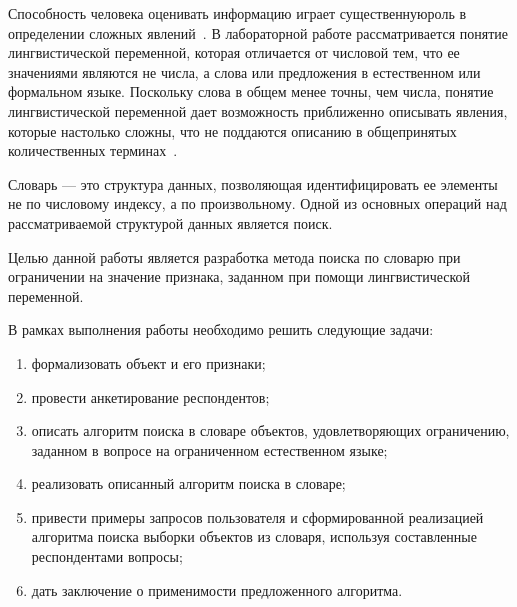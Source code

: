 \vspace{\baselineskip}

Способность человека оценивать информацию играет существенную\linebreak роль в определении сложных явлений~\cite{ling2}. 
В лабораторной работе рассматривается понятие лингвистической переменной, которая отличается от числовой тем, что ее значениями являются не числа, а слова или предложения в естественном или формальном языке. 
Поскольку слова в общем менее точны, чем числа, понятие лингвистической переменной дает возможность приближенно описывать явления, которые настолько сложны, что не поддаются описанию в общепринятых количественных терминах~\cite{ling1}.

Словарь --- это структура данных, позволяющая идентифицировать ее элементы не по числовому индексу, а по произвольному.
Одной из основных операций над рассматриваемой структурой данных является поиск.

Целью данной работы является разработка метода поиска по словарю при ограничении на значение признака, заданном при помощи лингвистической переменной.

В рамках выполнения работы необходимо решить следующие задачи: 
\begin{enumerate}[label=---]
        \item формализовать объект и его признаки;
        \item провести анкетирование респондентов; 
        \item описать алгоритм поиска в словаре объектов, удовлетворяющих ограничению, заданном в вопросе на ограниченном естественном языке;
	\item реализовать описанный алгоритм поиска в словаре;
        \item привести примеры запросов пользователя и сформированной реализацией алгоритма поиска выборки объектов из словаря, используя составленные респондентами вопросы;
        \item дать заключение о применимости предложенного алгоритма.
\end{enumerate}